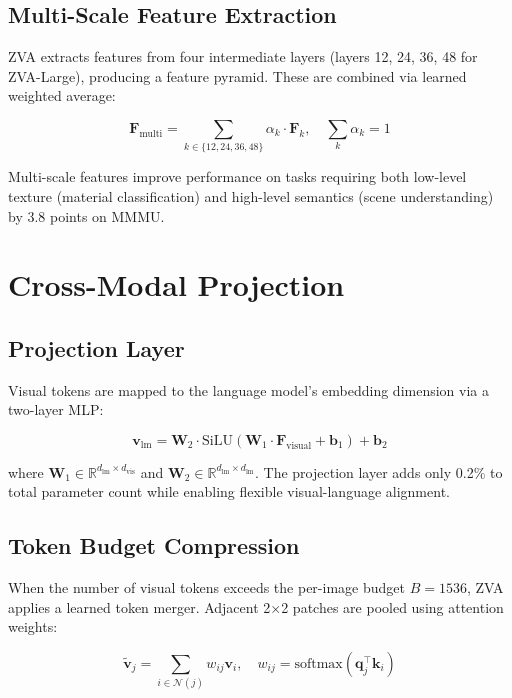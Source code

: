 \documentclass[11pt,a4paper]{article}
\begin{document}
\subsection{Multi-Scale Feature Extraction}

ZVA extracts features from four intermediate layers (layers 12, 24, 36, 48 for ZVA-Large), producing a feature pyramid. These are combined via learned weighted average:

\begin{equation}
\mathbf{F}_{\text{multi}} = \sum_{k \in \{12,24,36,48\}} \alpha_k \cdot \mathbf{F}_k, \quad \sum_k \alpha_k = 1
\end{equation}

Multi-scale features improve performance on tasks requiring both low-level texture (material classification) and high-level semantics (scene understanding) by 3.8 points on MMMU.

\section{Cross-Modal Projection}

\subsection{Projection Layer}

Visual tokens are mapped to the language model's embedding dimension via a two-layer MLP:

\begin{equation}
\mathbf{v}_{\text{lm}} = \mathbf{W}_2 \cdot \text{SiLU}(\mathbf{W}_1 \cdot \mathbf{F}_{\text{visual}} + \mathbf{b}_1) + \mathbf{b}_2
\end{equation}

where $\mathbf{W}_1 \in \mathbb{R}^{d_{\text{lm}} \times d_{\text{vis}}}$ and $\mathbf{W}_2 \in \mathbb{R}^{d_{\text{lm}} \times d_{\text{lm}}}$. The projection layer adds only 0.2\% to total parameter count while enabling flexible visual-language alignment.

\subsection{Token Budget Compression}

When the number of visual tokens exceeds the per-image budget $B = 1536$, ZVA applies a learned token merger. Adjacent 2$\times$2 patches are pooled using attention weights:

\begin{equation}
\tilde{\mathbf{v}}_j = \sum_{i \in \mathcal{N}(j)} w_{ij} \mathbf{v}_i, \quad w_{ij} = \text{softmax}(\mathbf{q}_j^\top \mathbf{k}_i)
\end{equation}
\end{document}
